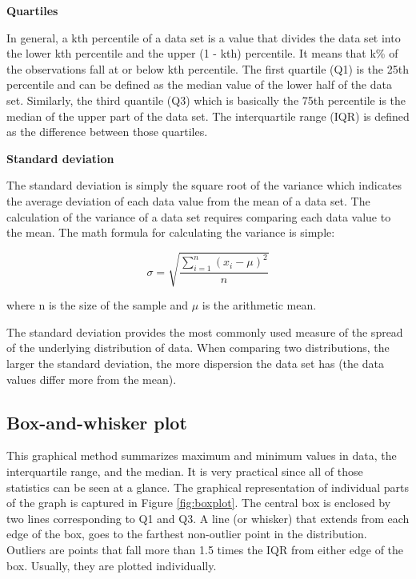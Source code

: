 \documentclass[a4paper,10pt,twoside]{article}
\begin{document}
\smallskip
\noindent \textbf{Quartiles}
\smallskip

\noindent In general, a kth percentile of a data set is a value that divides the data set into the lower kth percentile and the upper (1 - kth) percentile. It means that k\% of the observations fall at or below kth percentile. The first quartile (Q1) is the 25th percentile and can be defined as the median value of the lower half of the data set. Similarly, the third quantile (Q3) which is basically the 75th percentile is the median of the upper part of the data set. The interquartile range (IQR) is defined as the difference between those quartiles.

\smallskip
\noindent \textbf{Standard deviation}
\smallskip

\noindent The standard deviation is simply the square root of the variance which indicates the average deviation of each data value from the mean of a data set. The calculation of the variance of a data set requires comparing each data value to the mean. The math formula for calculating the variance is simple:

$$
\sigma = \sqrt{\frac{\displaystyle\sum_{i=1}^{n}(x_i - \mu)^2} {n}}
$$

\noindent where n is the size of the sample and $\mu$ is the arithmetic mean.

The standard deviation provides the most commonly used measure of the spread of the underlying distribution of data. When comparing two distributions, the larger the standard deviation, the more dispersion the data set has (the data values differ more from the mean).


\newpage
\vspace*{-1cm}
\subsection{Box-and-whisker plot}

\noindent This graphical method summarizes maximum and minimum values in data, the interquartile range, and the median. It is very practical since all of those statistics can be seen at a glance. The graphical representation of individual parts of the graph is captured in Figure \ref{fig:boxplot}. The central box is enclosed by two lines corresponding to Q1 and Q3. A line (or whisker) that extends from each edge of the box, goes to the farthest non-outlier point in the distribution. Outliers are points that fall more than 1.5 times the IQR from either edge of the box. Usually, they are plotted individually.
\end{document}
